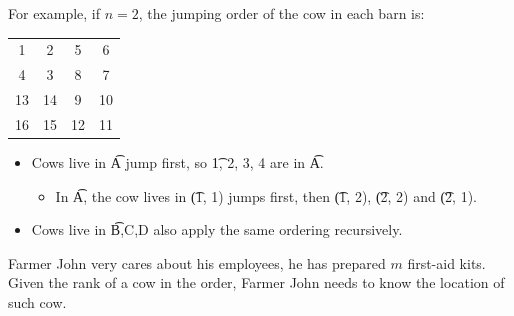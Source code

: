 \newpage
For example, if $n=2$, the jumping order of the cow in each barn is:
\begin{center}
  \begin{table}[h]
    \centering
    \begin{tabular}{|c c c c|}
      \hline
      1   &   2   &   5   &   6   \\
      4   &   3   &   8   &   7   \\
      13  &   14  &   9   &   10  \\
      16  &   15  &   12  &   11  \\
      \hline
    \end{tabular}
  \end{table}
  \begin{itemize}
    \item Cows live in \t{A} jump first, so \t{1, 2, 3, 4} are in \t{A}.
      \begin{itemize}
        \item In \t{A}, the cow lives in \t{(1, 1)} jumps first, then \t{(1, 2)}, \t{(2, 2)} and \t{(2, 1)}.
      \end{itemize}
    \item Cows live in \t{B,C,D} also apply the same ordering recursively.
  \end{itemize}
\end{center}


Farmer John very cares about his employees, he has prepared $m$ first-aid kits.
Given the rank of a cow in the order, Farmer John needs to know the location of such cow.
